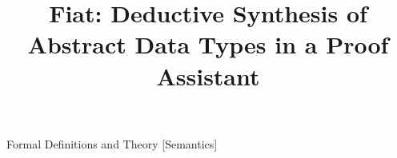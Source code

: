 \documentclass[preprint]{sigplanconf}
\begin{document}
\title{Fiat: Deductive Synthesis of Abstract Data Types in a Proof Assistant}


\maketitle

\begin{abstract}



\end{abstract}

               {Formal Definitions and Theory}
               [Semantics]

\keywords















\cleardoublepage

\appendix
%
\end{document}
